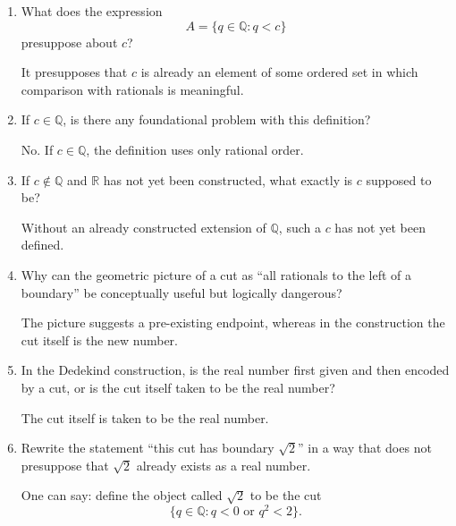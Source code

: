 \documentclass{self-check}
\begin{document}
\begin{enumerate}[label=\arabic*., itemsep=10pt]

\item What does the expression
\[
A=\{q\in\mathbb{Q}:q<c\}
\]
presuppose about $c$?

\begin{answer}
It presupposes that $c$ is already an element of some ordered set in which comparison with rationals is meaningful.
\end{answer}

\item If $c\in\mathbb{Q}$, is there any foundational problem with this definition?

\begin{answer}
No. If $c\in\mathbb{Q}$, the definition uses only rational order.
\end{answer}

\item If $c\notin\mathbb{Q}$ and $\mathbb{R}$ has not yet been constructed, what exactly is $c$ supposed to be?

\begin{answer}
Without an already constructed extension of $\mathbb{Q}$, such a $c$ has not yet been defined.
\end{answer}

\item Why can the geometric picture of a cut as ``all rationals to the left of a boundary'' be conceptually useful but logically dangerous?

\begin{answer}
The picture suggests a pre-existing endpoint, whereas in the construction the cut itself is the new number.
\end{answer}

\item In the Dedekind construction, is the real number first given and then encoded by a cut, or is the cut itself taken to be the real number?

\begin{answer}
The cut itself is taken to be the real number.
\end{answer}

\item Rewrite the statement
``this cut has boundary $\sqrt{2}$''
in a way that does not presuppose that $\sqrt{2}$ already exists as a real number.

\begin{answer}
One can say: define the object called $\sqrt2$ to be the cut
\[
\{q\in\mathbb{Q}:q<0\text{ or }q^2<2\}.
\]
\end{answer}


\end{enumerate}
\end{document}
